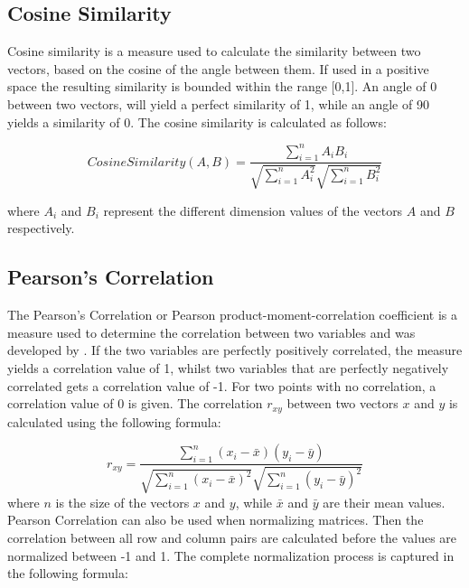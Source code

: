 \subsection{Cosine Similarity}
\label{sec:cosine_similarity}
Cosine similarity is a measure used to calculate the similarity between two vectors, based on the cosine of the angle between them. If used in a positive space the resulting similarity is bounded within the range [0,1]. An angle of 0\degree{} between two vectors, will yield a perfect similarity of 1, while an angle of 90\degree{} yields a similarity of 0. The cosine similarity is calculated as follows:

\begin{equation}
    Cosine Similarity(A, B) = \frac{\sum\limits_{i=1}^{n}A_i B_i}{\sqrt{\sum\limits_{i=1}^{n}A_i^2} \sqrt{\sum\limits_{i=1}^{n}B_i^2}}
\end{equation}

\noindent where $A_i$ and $B_i$ represent the different dimension values of the vectors $A$ and $B$ respectively.


\subsection{Pearson's Correlation}
\label{sec:pearson_correlation}
The Pearson's Correlation or Pearson product-moment-correlation coefficient is a measure used to determine the correlation between two variables and was developed by \cite{Pearson253}. If the two variables are perfectly positively correlated, the measure yields a correlation value of 1, whilst two variables that are perfectly negatively correlated gets a correlation value of -1. For two points with no correlation, a correlation value of 0 is given. The correlation $r_{xy}$ between two vectors $x$ and $y$ is calculated using the following formula:


\begin{equation}
    r_{xy} = \frac{\sum\limits_{i=1}^{n}(x_i-\bar{x})(y_i-\bar{y})}{\sqrt{\sum\limits_{i=1}^{n}(x_i-\bar{x})^2}\sqrt{\sum\limits_{i=1}^{n}(y_i-\bar{y})^2}}
\end{equation}
where $n$ is the size of the vectors $x$ and $y$, while $\bar{x}$ and $\bar{y}$ are their mean values. \\

Pearson Correlation can also be used when normalizing matrices. Then the correlation between all row and column pairs are calculated before the values are normalized between -1 and 1. The complete normalization process is captured in the following formula:

